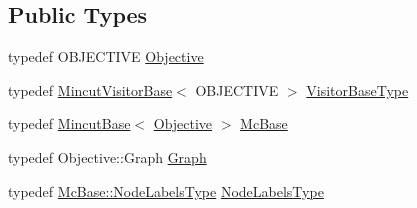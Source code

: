 \subsection*{Public Types}
\begin{DoxyCompactItemize}
\item 
typedef O\+B\+J\+E\+C\+T\+I\+V\+E \hyperlink{classnifty_1_1graph_1_1optimization_1_1mincut_1_1PyMincutBase_a58f31d5b9739bc97189eeebbedb2026c}{Objective}
\item 
typedef \hyperlink{namespacenifty_1_1graph_1_1optimization_1_1mincut_a95cebea00c03e9d82bf37342468c1fd9}{Mincut\+Visitor\+Base}$<$ O\+B\+J\+E\+C\+T\+I\+V\+E $>$ \hyperlink{classnifty_1_1graph_1_1optimization_1_1mincut_1_1PyMincutBase_ae4b7fb9386890597f91516f38b36c0b8}{Visitor\+Base\+Type}
\item 
typedef \hyperlink{classnifty_1_1graph_1_1optimization_1_1mincut_1_1MincutBase}{Mincut\+Base}$<$ \hyperlink{classnifty_1_1graph_1_1optimization_1_1mincut_1_1PyMincutBase_a58f31d5b9739bc97189eeebbedb2026c}{Objective} $>$ \hyperlink{classnifty_1_1graph_1_1optimization_1_1mincut_1_1PyMincutBase_a4dea5f849cc7c483173f8a56aeb058ba}{Mc\+Base}
\item 
typedef Objective\+::\+Graph \hyperlink{classnifty_1_1graph_1_1optimization_1_1mincut_1_1PyMincutBase_ab156fc8171dcce17d5277b53f12b6d14}{Graph}
\item 
typedef \hyperlink{classnifty_1_1graph_1_1optimization_1_1common_1_1SolverBase_a6e4e465f3b6e039882669fcfb9714818}{Mc\+Base\+::\+Node\+Labels\+Type} \hyperlink{classnifty_1_1graph_1_1optimization_1_1mincut_1_1PyMincutBase_a5ad1fd129bf9449a5f44b525b51a7be3}{Node\+Labels\+Type}
\end{DoxyCompactItemize}
